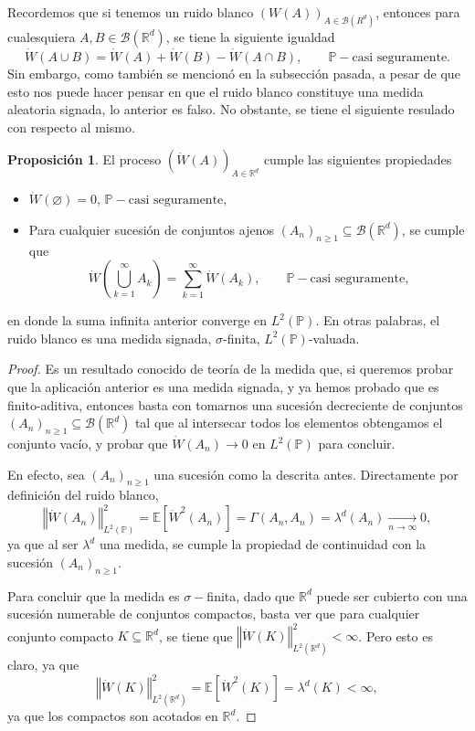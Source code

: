 \documentclass[letterpaper,twoside,12pt]{book}
\newcommand{\R}{\mathbb{R}}
\newcommand{\B}{\mathcal{B}}
\newcommand{\E}{\mathbb{E}}
\renewcommand{\P}{\mathbb{P}}
\newcommand{\W}{\dot{W}}
\newcommand{\1}{\mathds{1}}
\renewcommand{\to}{\rightarrow}
\newcommand{\norm}[1]{\left\Vert #1 \right\Vert}
\theoremstyle{definition}
\theoremstyle{definition}
\theoremstyle{definition}
\theoremstyle{definition}
\newtheorem{prop}{Proposición}
\theoremstyle{definition}
\theoremstyle{definition}
\theoremstyle{definition}
\begin{document}
Recordemos que si tenemos un ruido blanco $(W(A))_{A\in \B(R^{d})}$, entonces para cualesquiera $A,B \in \B(\R^{d})$, se tiene la siguiente igualdad
\[
\W(A\cup B)=\W(A)+\W(B)-\W(A\cap B), \qquad \P-\text{casi seguramente.}   
\]
Sin embargo, como también se mencionó en la subsección pasada, a pesar de que esto nos puede hacer pensar en que el ruido blanco constituye una medida aleatoria signada, lo anterior es falso. No obstante, se tiene el siguiente resulado con respecto al mismo.
\begin{prop}\label{Finito_aditiv_ruido_blanco}
 El proceso $(\W(A))_{A\in \R^{d}}$ cumple las siguientes propiedades
 \begin{itemize}
    \item $\W(\varnothing)=0$, \qquad $\P-\text{casi seguramente,}$
    \item Para cualquier sucesión de conjuntos ajenos $(A_n)_{n\geq 1}\subseteq \B(\R^d)$, se cumple que 
    \[
    \W \left(\bigcup_{k=1}^\infty A_k\right)=\sum_{k=1}^{\infty}\W(A_k), \qquad \P-\text{casi seguramente,} 
    \]
 \end{itemize}
 en donde la suma infinita anterior converge en $L^2(\P)$. En otras palabras, el 
 ruido blanco es una medida signada, $\sigma$-finita, $L^2(\P)$-valuada.
\end{prop}
 \begin{proof} 
    Es un resultado conocido de teoría de la medida que, si queremos probar que la aplicación anterior es una medida signada, y ya hemos probado que es finito-aditiva, entonces basta con tomarnos una sucesión decreciente de conjuntos $(A_n)_{n\geq1}\subseteq\B(\R^{d})$ tal que al intersecar todos los elementos obtengamos el conjunto vacío, y probar que $\W(A_n)\to 0$ en $L^{2}(\P)$ para concluir.

    En efecto, sea $(A_n)_{n\geq1}$ una sucesión como la descrita antes. Directamente por definición del ruido blanco, 
    \[
    \norm{\W(A_n)}_{L^2(\P)}^2=\E\left[\W^2(A_n)\right]=\Gamma(A_n,A_n)=\lambda^{d}(A_n)\xrightarrow[n\to\infty]{}0,    
    \]
    ya que al ser $\lambda^d$ una medida, se cumple la propiedad de continuidad con la sucesión $(A_n)_{n\geq1}$.

    Para concluir que la medida es $\sigma-$finita, dado que $\R^{d}$ puede ser cubierto con una sucesión numerable de conjuntos compactos, basta ver que para cualquier conjunto compacto $K\subseteq\R^{d}$, se tiene que $\norm{\W(K)}_{L^ {2}(\R^{d})}^2<\infty$. Pero esto es claro, ya que 
    \[
        \norm{\W(K)}_{L^ {2}(\R^{d})}^2=\E\left[\W^2(K)\right]=\lambda^{d}(K)<\infty,
    \]
    ya que los compactos son acotados en $\R^{d}$.
  \end{proof}  
\end{document}
